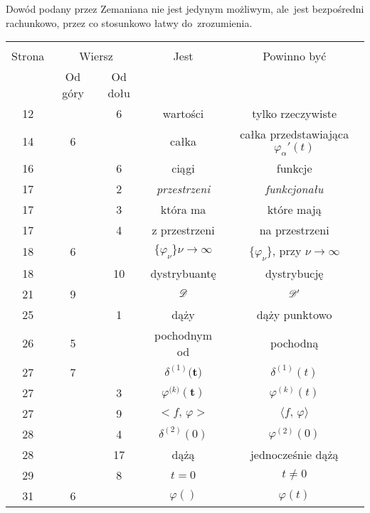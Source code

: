 \documentclass[a4paper,11pt]{article}
\begin{document}
Dowód podany przez Zemaniana nie jest jedynym możliwym, ale~jest
bezpośredni rachunkowo, przez co stosunkowo łatwy do~zrozumienia.





\newpage



\begin{center}

  \begin{tabular}{|c|c|c|c|c|}
    \hline
    & \multicolumn{2}{c|}{} & & \\
    Strona & \multicolumn{2}{c|}{Wiersz} & Jest
                              & Powinno być \\ \cline{2-3}
    & Od góry & Od dołu & & \\
    \hline
    12  & &  6 & wartości & tylko rzeczywiste \\
    14  &  6 & & całka & całka przedstawiająca $\varphi_{ \alpha }'( t )$ \\
    16  & &  6 & ciągi & funkcje \\
    17  & &  2 & \textit{przestrzeni} & \textit{funkcjonału} \\
    17  & &  3 & która ma & które mają \\
    17  & &  4 & z przestrzeni & na przestrzeni \\
    18  &  6 & & $\{ \varphi_{ \nu } \}\nu \to \infty$
           & $\{ \varphi_{ \nu } \}$, przy $\nu \to \infty$ \\
    18  & & 10 & dystrybuantę & dystrybucję \\
    21  &  9 & & $\mathcal{D}$ & $\mathcal{D}'$ \\
    25  & &  1 & dąży & dąży punktowo \\
    26  &  5 & & pochodnym od & pochodną \\
    27  &  7 & & $\delta^{ ( 1 ) }\boldsymbol{ ( t } )$ & $\delta^{ ( 1 ) }( t )$ \\
    27  & &  3 & $\varphi^{ ( k \boldsymbol{ ) } }\boldsymbol{ ( t ) } $
           & $\varphi^{ ( k ) }( t )$ \\
    27  & &  9 & $< f,\, \varphi >$ & $\langle f, \, \varphi \rangle$ \\
    28  & &  4 & $\delta^{ ( 2 ) }( 0 )$ & $\varphi^{ ( 2 ) }( 0 )$ \\
    28  & & 17 & dążą & jednocześnie dążą \\
    29  & &  8 & $t = 0$ & $t \neq 0$ \\
    31  &  6 & & $\varphi( )$ & $\varphi( t )$ \\

\end{tabular}
\end{center}
\end{document}
